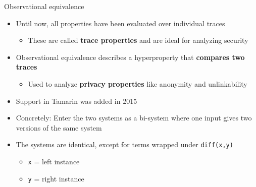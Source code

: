 \documentclass[11pt,aspectratio=169]{beamer}
\begin{document}
\begin{frame}[fragile]{Observational equivalence}
    \begin{itemize}
        \item Until now, all properties have been evaluated over individual 
              traces
        \begin{itemize}
            \item These are called \textbf{trace properties} and are ideal for 
                  analyzing security
        \end{itemize}
        \item Observational equivalence describes a hyperproperty that
              \textbf{compares two traces}
        \begin{itemize}
            \item Used to analyze \textbf{privacy properties} like anonymity 
                  and unlinkability
        \end{itemize}
        \item Support in Tamarin was added in 2015~\cite{basin2015obseq}
        \item Concretely: Enter the two systems as a bi-system where one input 
              gives two versions of the same system
        \item The systems are identical, except for terms wrapped under
              \texttt{diff(x,y)}
        \begin{itemize}
            \item \texttt{x} = left instance
            \item \texttt{y} = right instance
        \end{itemize}
    \end{itemize}
\end{frame}
\end{document}
